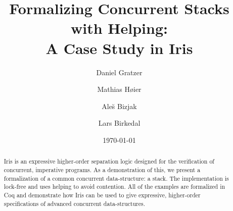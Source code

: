 \documentclass[12pt]{amsart}
\title{Formalizing Concurrent Stacks with Helping: \\
  A Case Study in Iris}
\author{Daniel Gratzer}
\author{Mathias H{\o}ier \and Ale{\u s} Bizjak \and Lars Birkedal}
\date{\today}
\begin{document}
\begin{abstract}
  Iris is an expressive higher-order separation logic designed for the
  verification of concurrent, imperative programs. As a demonstration
  of this, we present a formalization of a common concurrent
  data-structure: a stack. The implementation is lock-free and uses
  helping to avoid contention. All of the examples are formalized in
  Coq and demonstrate how Iris can be used to give expressive,
  higher-order specifications of advanced concurrent data-structures.
\end{abstract}
\maketitle









\nocite{*}
{}
\end{document}
